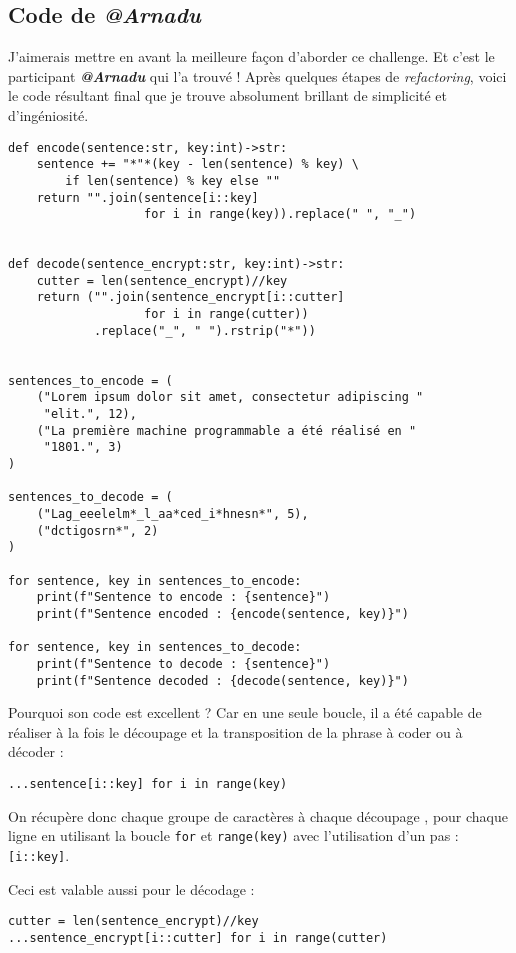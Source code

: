 \subsection*{Code de \textbf{\textit{@Arnadu}}}
J'aimerais mettre en avant la meilleure façon d'aborder ce challenge. Et c'est le participant \textbf{\textit{@Arnadu}} qui l'a trouvé ! Après quelques étapes de \textit{refactoring}, voici le code résultant final que je trouve absolument brillant de simplicité et d'ingéniosité.
\medskip

\begin{lstlisting}
def encode(sentence:str, key:int)->str:
    sentence += "*"*(key - len(sentence) % key) \
        if len(sentence) % key else ""
    return "".join(sentence[i::key]
                   for i in range(key)).replace(" ", "_")


def decode(sentence_encrypt:str, key:int)->str:
    cutter = len(sentence_encrypt)//key
    return ("".join(sentence_encrypt[i::cutter]
                   for i in range(cutter))
            .replace("_", " ").rstrip("*"))


sentences_to_encode = (
    ("Lorem ipsum dolor sit amet, consectetur adipiscing "
     "elit.", 12),
    ("La première machine programmable a été réalisé en "
     "1801.", 3)
)

sentences_to_decode = (
    ("Lag_eeelelm*_l_aa*ced_i*hnesn*", 5),
    ("dctigosrn*", 2)
)

for sentence, key in sentences_to_encode:
    print(f"Sentence to encode : {sentence}")
    print(f"Sentence encoded : {encode(sentence, key)}")

for sentence, key in sentences_to_decode:
    print(f"Sentence to decode : {sentence}")
    print(f"Sentence decoded : {decode(sentence, key)}")
\end{lstlisting}
\medskip

Pourquoi son code est excellent ? Car en une seule boucle, il a été capable de réaliser à la fois le découpage et la transposition de la phrase à coder ou à décoder :
\begin{verbatim}
...sentence[i::key] for i in range(key)
\end{verbatim}
\medskip

On récupère donc chaque groupe de caractères à chaque découpage , pour chaque ligne en utilisant la boucle \texttt{for} et \texttt{range(key)} avec l'utilisation d'un pas : \texttt{[i::key]}.
\medskip

Ceci est valable aussi pour le décodage :
\begin{verbatim}
cutter = len(sentence_encrypt)//key
...sentence_encrypt[i::cutter] for i in range(cutter)
\end{verbatim}
\medskip

